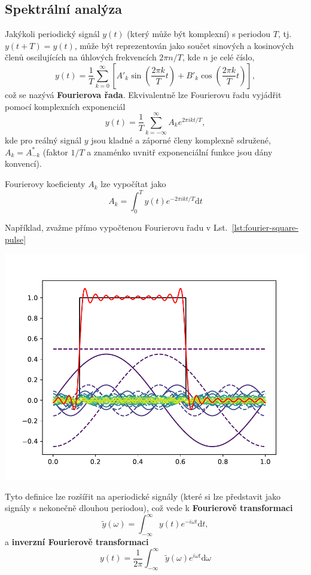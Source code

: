 \subsection{Spektrální analýza}
Jakýkoli periodický signál $y(t)$ (který může být komplexní) s periodou $T$, tj. $y(t + T) = y(t)$, může být reprezentován jako součet sinových a kosinových členů oscilujících na úhlových frekvencích $2\pi n/T$, kde $n$ je celé číslo,
\begin{equation}
    y(t) = \frac{1}{T} \sum_{k=0}^{\infty} \left[ A'_k\sin\left(\frac{2\pi k}{T}t\right) + B'_k\cos\left(\frac{2\pi k}{T}t\right)\right],
\end{equation}
což se nazývá \textbf{Fourierova řada}. Ekvivalentně lze Fourierovu řadu vyjádřit pomocí komplexních exponenciál
\begin{equation}
    y(t) = \frac{1}{T} \sum_{k=-\infty}^\infty A_k e^{2\pi ikt/T},
\end{equation}
kde pro reálný signál $y$ jsou kladné a záporné členy komplexně sdružené, $A_k = A_{-k}^*$ (faktor $1/T$ a znaménko uvnitř exponenciální funkce jsou dány konvencí).

Fourierovy koeficienty $A_k$ lze vypočítat jako
\begin{equation}
    A_k = \int_0^T y(t) e^{-2\pi ikt/T} \mathrm{d}t
\end{equation}

Například, zvažme přímo vypočtenou Fourierovu řadu v Lst.~\ref{lst:fourier-square-pulse}

\begin{center}
    \includegraphics[width=0.5\linewidth]{fourier_series_square_pulse.pdf}
\end{center}

Tyto definice lze rozšířit na aperiodické signály (které si lze představit jako signály s nekonečně dlouhou periodou), což vede k \textbf{Fourierově transformaci}
\begin{equation}
    \tilde y(\omega) = \int_{-\infty}^\infty y(t)e^{-i\omega t} \mathrm{d}t,
\end{equation}
a \textbf{inverzní Fourierově transformaci}
\begin{equation}
    y(t) = \frac{1}{2\pi}\int_{-\infty}^\infty \tilde y (\omega)e^{i\omega t}\mathrm{d}\omega
\end{equation}

